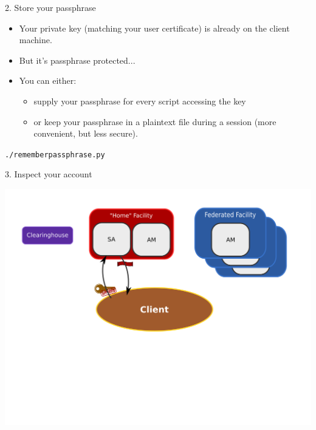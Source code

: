 \documentclass[landscape]{slides}
\newcommand{\heading}[1]{{\fontseries{b}\selectfont\begin{center}{\LARGE\color{red} #1}\end{center}}}
\newcommand{\code}[1]{\begin{center}{\tt #1}\end{center}}
\begin{document}
\begin{slide}
\heading{2. Store your passphrase}
\begin{itemize}
\item Your private key (matching your user certificate) is already
  on the client machine.
\item But it's passphrase protected...
\item You can either:
\begin{itemize}
 \item supply your passphrase for every script accessing the key
 \item or keep your passphrase in a plaintext file during a session (more
   convenient, but less secure).
\end{itemize}
\end{itemize}
\code{./rememberpassphrase.py}
\end{slide}

\begin{slide}
\heading{3. Inspect your account}
\begin{center}
\includegraphics[width=15cm]{tutorial-diagram-1}
\end{center}
\end{slide}
\end{document}
